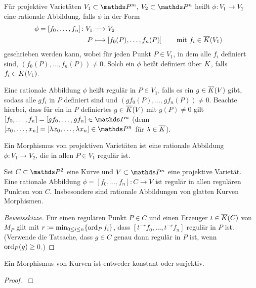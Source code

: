 \begin{Definition}
  Für projektive Varietäten $V_1\subset\P^m$, $V_2\subset\P^n$ heißt
  $\phi\colon V_1\to V_2$ eine rationale Abbildung,
  falls $\phi$ in der Form
  \begin{align*}
    \phi = [f_0,\dotsc, f_n]\colon V_1 &\longrightarrow V_2\\
    P &\longmapsto \left[f_0(P), \dotsc, f_n(P)\right] 
        \qquad \text{mit } f_i\in\overline K(V_1)
  \end{align*}
  geschrieben werden kann, 
  wobei für jeden Punkt $P\in V_1$, 
  in dem alle $f_i$ definiert sind, %
  $(f_0(P),\dotsc,f_n(P))\neq0$. %
  Solch ein $\phi$ heißt definiert über $K$,
  falls $f_i\in K(V_1)$. 

  Eine rationale Abbildung $\phi$ heißt regulär in $P\in V_1$,
  falls es ein $g\in\overline K(V)$ gibt, sodass
  alle $gf_i$ in $P$ definiert sind 
  und $(gf_0(P),\dotsc,gf_n(P))\neq0$.
  Beachte hierbei, 
  dass für ein in $P$ definiertes $g\in\overline K(V)$ mit $g(P)\neq0$ gilt
  $[f_0,\dotsc,f_n]=[gf_0,\dotsc, gf_n]\in\P^n$
  (denn $[x_0,\dotsc,x_n]=[\lambda x_0,\dotsc,\lambda x_n]\in\P^n$ für
  $\lambda\in\overline K$).
  
  Ein Morphismus von projektiven Varietäten ist eine rationale
  Abbildung $\phi\colon V_1\to V_2$, die in allen $P\in V_1$ regulär
  ist.
\end{Definition}

\begin{Lemma}\label{ratabbglattekurven}
  Sei $C\subset\P^2$ eine Kurve und $V\subset\P^n$ eine projektive
  Varietät. 
  Eine rationale Abbildung $\phi=[f_0,\dotsc, f_n]\colon C\to V$ ist
  regulär in allen regulären Punkten von $C$.
  Insbesondere sind rationale Abbildungen von glatten Kurven
  Morphismen.
  \begin{proof}[Beweisskizze]
    Für einen regulären Punkt $P\in C$ und einen Erzeuger
    $t\in\overline K(C)$ von $M_P$ gilt mit 
    $r\coloneqq\min_{0\leq i\leq n}\{\operatorname{ord}_Pf_i\}$,
    dass $[t^{-r}f_0,\dotsc,t^{-r}f_n]$ regulär in $P$ ist.
    (Verwende die Tatsache, dass $g\in C$ genau dann regulär in $P$
    ist, wenn $\operatorname{ord}_P(g)\geq0$.)
  \end{proof}
\end{Lemma}

\begin{Lemma}\label{morphismensurj}
  Ein Morphismus von Kurven ist entweder konstant oder surjektiv.
  \begin{proof}
    \cite[siehe][Theorem II.2.3]{silverman}
  \end{proof}
\end{Lemma}

